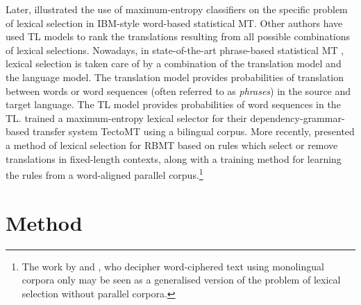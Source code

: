 \documentclass[11pt]{article}
\newcommand{\todomlf}[1]{\renewcommand{\baselinestretch}{0.55}\todo{\scriptsize\sf MLF: #1}\renewcommand{\baselinestretch}{1.0}}
\begin{document}
Later, \cite{berger1996} illustrated the use of maximum-entropy
classifiers on the specific problem of lexical selection in IBM-style
word-based statistical MT. Other authors \citep{melero07a} have used
TL models to rank %
the translations resulting from all possible combinations of lexical
selections. Nowadays, in state-of-the-art phrase-based
statistical %
MT \citep{koehn2009statistical}, lexical selection is taken care of by
a combination of the translation model and the language model. The
translation model provides probabilities of translation between words
or word sequences (often referred to as \emph{phrases}) in the source
and target language. The TL model provides probabilities of word
sequences in the TL.
\cite{marechek10} trained a maximum-entropy lexical selector for their
dependency-grammar-based transfer system TectoMT using a bilingual
corpus.  More recently, \cite{tyers12a} presented a method of lexical
selection for RBMT based on rules which select or remove translations
in fixed-length contexts, along with a training method for learning
the rules from a word-aligned parallel corpus.\footnote{The work by \cite{ravi2011deciphering} and \cite{nuhn2014decipherment}, who decipher word-ciphered text using monolingual corpora only may be seen as a generalised version of the problem of lexical selection without parallel corpora.}



\section{Method}
\end{document}
